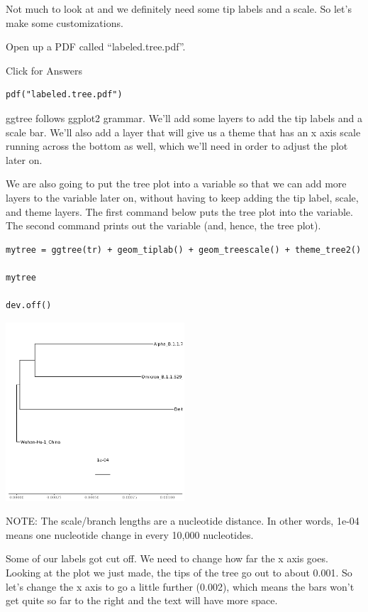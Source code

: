 \documentclass[
]{book}
\begin{document}
Not much to look at and we definitely need some tip labels and a scale. So let's make some customizations.

Open up a PDF called ``labeled.tree.pdf''.

Click for Answers

\begin{verbatim}
pdf("labeled.tree.pdf")
\end{verbatim}

\hfill\break

ggtree follows ggplot2 grammar. We'll add some layers to add the tip labels and a scale bar. We'll also add a layer that will give us a theme that has an x axis scale running across the bottom as well, which we'll need in order to adjust the plot later on.

We are also going to put the tree plot into a variable so that we can add more layers to the variable later on, without having to keep adding the tip label, scale, and theme layers. The first command below puts the tree plot into the variable. The second command prints out the variable (and, hence, the tree plot).

\begin{verbatim}
mytree = ggtree(tr) + geom_tiplab() + geom_treescale() + theme_tree2()

mytree

dev.off()
\end{verbatim}

\includegraphics[width=0.5\textwidth,height=\textheight]{./Figures/labeled.tree.png}

NOTE: The scale/branch lengths are a nucleotide distance. In other words, 1e-04 means one nucleotide change in every 10,000 nucleotides.

Some of our labels got cut off. We need to change how far the x axis goes. Looking at the plot we just made, the tips of the tree go out to about 0.001. So let's change the x axis to go a little further (0.002), which means the bars won't get quite so far to the right and the text will have more space.
\end{document}
